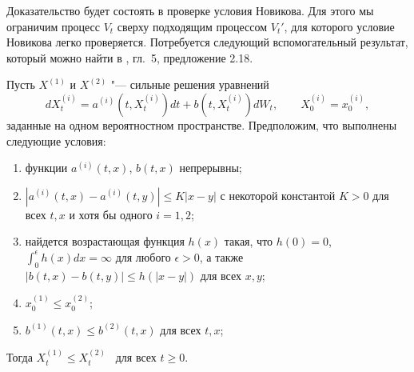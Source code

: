 Доказательство будет состоять в проверке условия Новикова.
Для этого мы ограничим процесс $V_t$ сверху подходящим процессом $V_t'$, для которого условие Новикова легко проверяется.
Потребуется следующий вспомогательный результат, который можно найти в \cite{KaratzasShreve91}, гл.~5, предложение 2.18.

\begin{lemma}
Пусть $X^{(1)}$ и $X^{(2)}$ "--- сильные решения уравнений
\[
d X_t^{(i)} = a^{(i)}(t, X_t^{(i)}) dt + b(t,X_t^{(i)}) d W_t, \qquad X_0^{(i)} = x_0^{(i)},
\]
заданные на одном вероятностном пространстве.
Предположим, что выполнены следующие условия:
\begin{enumerate}
\item функции $a^{(i)}(t,x)$, $b(t,x)$ непрерывны;
\item $|a^{(i)}(t,x) - a^{(i)}(t,y)| \le K|x-y|$ с некоторой константой $K>0$ для всех $t,x$ и хотя бы одного $i=1,2$;
\item найдется возрастающая функция $h(x)$ такая, что $h(0) = 0$, $\int_0^\epsilon h(x) dx = \infty$ для любого $\epsilon>0$, а также $|b(t,x) - b(t,y)| \le h(|x-y|)$ для всех $x,y$;
\item $x_0^{(1)} \le x_0^{(2)}$;
\item $b^{(1)}(t,x) \le b^{(2)}(t,x)$ для всех $t,x$;
\end{enumerate}
Тогда $X_t^{(1)} \le X_t^{(2)}$ \as\ для всех $t\ge 0$.
\end{lemma}

